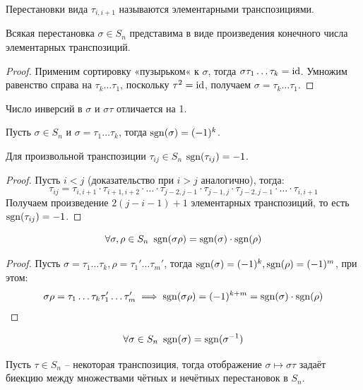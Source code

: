 \documentclass[12pt]{article}
\begin{document}
\begin{definition}
	Перестановки вида $\tau_{i,i+1}$ называются элементарными транспозициями.
\end{definition}
\begin{statement}
	Всякая перестановка $\sigma\in S_n$ представима в виде произведения
	конечного числа элементарных транспозиций.
	\begin{proof}
		Применим сортировку «пузырьком« к $\sigma$, тогда
		$\sigma\tau_1\ldots\tau_k=\operatorname{id}$. Умножим равенство справа на
		$\tau_k\ldots\tau_1$, поскольку $\tau^2=\operatorname{id}$, получаем
		$\sigma=\tau_k\ldots\tau_1$.
	\end{proof}
\end{statement}
\begin{lemma}
	Число инверсий в $\sigma$ и $\sigma\tau$ отличается на 1.
\end{lemma}
\begin{consequence}
	Пусть $\sigma\in S_n$ и $\sigma=\tau_1\ldots\tau_k$, тогда
	$\operatorname{sgn}(\sigma)=(-1)^k$.
\end{consequence}
\begin{consequence}
	Для произвольной транспозиции $\tau_{ij}\in S_n$ $\operatorname{sgn}(\tau_{ij})=-1$.
	\begin{proof}
		Пусть $i<j$ (доказательство при $i>j$ аналогично), тогда:
		\[\tau_{ij}=\tau_{i,i+1}\cdot\tau_{i+1,i+2}\cdot\ldots\cdot\tau_{j-2,j-1}\cdot\tau_{j-1,j}\cdot\tau_{j-2,j-1}\cdot\ldots\cdot\tau_{i,i+1}\]		Получаем
		произведение $2(j-i-1)+1$ элементарных транспозиций, то
		есть $\operatorname{sgn}(\tau_{ij})=-1$.
	\end{proof}
\end{consequence}
\begin{theorem}
	\[\forall \sigma,\rho\in S_n\ \sgn(\sigma\rho)=\sgn(\sigma)\cdot\sgn(\rho)\]	
	\begin{proof}
		Пусть $\sigma=\tau_1\ldots\tau_k, \rho=\tau_1'\ldots\tau_m'$, тогда
		$\operatorname{sgn}(\sigma)=(-1)^k, \operatorname{sgn}(\rho)=(-1)^m$, при этом:
		\[\sigma\rho=\tau_1\ldots\tau_k\tau_1'\ldots\tau_m'\implies
		\operatorname{sgn}(\sigma\rho)=(-1)^{k+m}=\operatorname{sgn}(\sigma)\cdot\operatorname{sgn}(\rho)\]	
	\end{proof}
\end{theorem}
\begin{consequence}
	\[\forall \sigma\in S_n\ \sgn(\sigma)=\sgn(\sigma^{-1})\]
\end{consequence}
\begin{statement}
	Пусть $\tau\in S_n$ -- некоторая транспозиция, тогда отображение
	$\sigma\mapsto\sigma\tau$ задаёт биекцию между множествами чётных и
	нечётных перестановок в $S_n$.
\end{statement}
\end{document}
